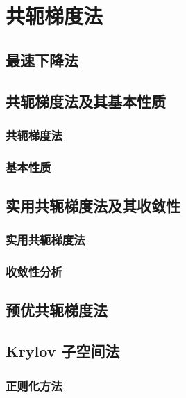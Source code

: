 \chapter{共轭梯度法}

\section{最速下降法}

\pending

\section{共轭梯度法及其基本性质}

\subsection{共轭梯度法}

\pending

\subsection{基本性质}

\pending

\section{实用共轭梯度法及其收敛性}

\subsection{实用共轭梯度法}

\pending

\subsection{收敛性分析}

\pending

\section{预优共轭梯度法}

\pending

\section{Krylov 子空间法}

\subsection{正则化方法}

